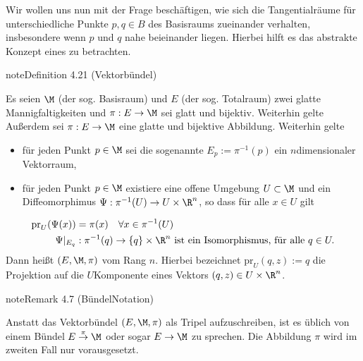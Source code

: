 \documentclass[letterpaper,10pt,english]{jupyterBook}
\begin{document}
\sphinxAtStartPar
Wir wollen uns nun mit der Frage beschäftigen, wie sich die Tangentialräume für unterschiedliche Punkte \(p,q\in B\) des Basisraums zueinander verhalten, insbesondere wenn \(p\) und \(q\) nahe beieinander liegen.
Hierbei hilft es das abstrakte Konzept eines  zu betrachten.
\label{manifolds/tangential:definition-24}
\begin{sphinxadmonition}{note}{Definition 4.21 (Vektorbündel)}



\sphinxAtStartPar
Es seien \(\M\) (der sog. Basisraum) und \(E\) (der sog. Totalraum) zwei glatte Mannigfaltigkeiten und \(\pi:E\to \M\) sei glatt und bijektiv. Weiterhin gelte
Außerdem sei \(\pi:E\to \M\) eine glatte und bijektive Abbildung.
Weiterhin gelte
\begin{itemize}
\item {} 
\sphinxAtStartPar
für jeden Punkt \(p\in \M\) sei die sogenannte  \(E_p:= \pi^{-1}(p)\) ein \(n\)\sphinxhyphen{}dimensionaler Vektorraum,

\item {} 
\sphinxAtStartPar
für jeden Punkt \(p\in \M\) existiere eine offene Umgebung \(U\subset \M\) und ein Diffeomorphimus \(\Psi: \pi^{-1}(U)\to U\times\R^n\), so dass für alle \(x\in U\) gilt

\end{itemize}
\begin{equation*}
\begin{split}\text{pr}_U(\Psi(x)) &= \pi(x)\quad\forall x\in \pi^{-1}(U)\\
\Psi\rvert_{E_q}&: \pi^{-1}(q) \to \{q\}\times \R^n \text{ ist ein Isomorphismus, für alle }q\in U.\end{split}
\end{equation*}
\sphinxAtStartPar
Dann heißt \((E,\M,\pi)\)  vom Rang \(n\).
Hierbei bezeichnet \(\text{pr}_U(q, z):= q\) die Projektion auf die \(U\)\sphinxhyphen{}Komponente eines Vektors \((q,z)\in U\times\R^n\).
\end{sphinxadmonition}
\label{manifolds/tangential:remark-25}
\begin{sphinxadmonition}{note}{Remark 4.7 (Bündel\sphinxhyphen{}Notation)}



\sphinxAtStartPar
Anstatt das Vektorbündel \((E,\M,\pi)\) als Tripel aufzuschreiben, ist es üblich von einem Bündel \(E\overset{\pi}{\to}\M\) oder sogar \(E\to\M\) zu sprechen.
Die Abbildung \(\pi\) wird im zweiten Fall nur  vorausgesetzt.
\end{sphinxadmonition}
\end{document}
